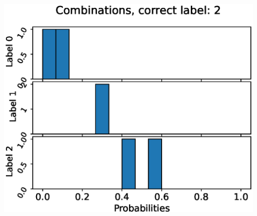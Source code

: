 \begin{center}
\begin{minipage}{0.33\textwidth}
  \includegraphics[width=\textwidth]{files/figs/app/hists/kmfp/c2.eps}
\end{minipage}


\end{center}
